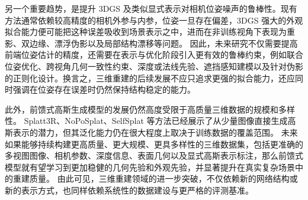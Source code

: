 另一个重要趋势，是提升 3DGS 及类似显式表示对相机位姿噪声的鲁棒性。现有方法通常依赖较高精度的相机外参与内参，位姿一旦存在偏差，3DGS 强大的外观拟合能力便可能把这种误差吸收到场景表示之中，进而在非训练视角下表现为重影、双边缘、漂浮伪影以及局部结构漂移等问题。
因此，未来研究不仅需要提高前端位姿估计的精度，还需要在表示与优化阶段引入更有效的鲁棒约束，例如联合位姿优化、跨视角几何一致性约束、深度或法线先验、遮挡感知建模以及针对伪影的正则化设计。换言之，三维重建的后续发展不应只追求更强的拟合能力，还应同时强调在位姿存在误差时仍然保持结构稳定的能力。

此外，前馈式高斯生成模型的发展仍然高度受限于高质量三维数据的规模和多样性。
Splatt3R、NoPoSplat、SelfSplat 等方法已经展示了从少量图像直接生成高斯表示的潜力，但其泛化能力仍在很大程度上取决于训练数据的覆盖范围。
未来如果能够持续构建更高质量、更大规模、更具多样性的三维数据集，包括更准确的多视图图像、相机参数、深度信息、表面几何以及显式高斯表示标注，那么前馈式模型就有望学习到更加稳健的几何先验和外观先验，并显著提升在真实复杂场景中的重建质量。
由此可见，三维重建领域的进一步突破，不仅依赖新的网络结构或新的表示方式，也同样依赖系统性的数据建设与更严格的评测基准。

\newpage
\begingroup
    \printbibliography[title={参考文献}]
\endgroup
